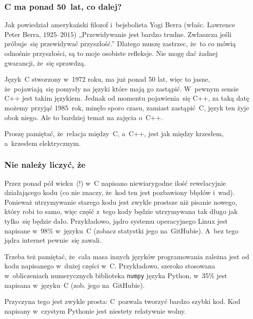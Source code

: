 \documentclass[10pt,t]{beamer}
\begin{document}
\begin{frame}
  \frametitle{C ma ponad 50~lat, co dalej?}


  Jak powiedział amerykański filozof i~bejsbolista Yogi Berra
  (właśc. Lawrence Peter Berra, $1925 \text{--} 2015$) „Przewidywanie jest
  bardzo trudne. Zwłaszcza jeśli próbuje~się przewidywać przyszłość.”
  Dlatego muszę zastrzec, że~to co mówią odnośnie przyszłości, są to moje
  osobiste refleksje. Nie mogę dać żadnej gwarancji, że~się sprawdzą.

  Język~C stworzony w~1972 roku, ma już ponad 50 lat, więc to jasne,
  że~pojawiają~się pomysły na języki które mają go zastąpić. W~pewnym sensie
  C++ jest takim językiem. Jednak od momentu pojawienia~się C++, za taką
  datę możemy przyjąć 1985~rok, minęło sporo czasu, zamiast zastąpić~C,
  język ten żyje obok niego. Ale to bardziej temat na zajęcia o~C++.

  Proszę pamiętać, że~relacja między~C, a~C++, jest jak między krzesłem,
  a~krzesłem elektrycznym.

\end{frame}





\begin{frame}
  \frametitle{Nie należy liczyć, że}


  Przez ponad pół wieku~(!) w~C napisano niewiarygodne ilość rewelacyjnie
  działającego kodu (co nie znaczy, że~kod ten jest pozbawiony błędów
  i~wad). Ponieważ utrzymywanie starego kodu jest zwykle prostsze niż
  pisanie nowego, który robi to samo, więc część z~tego kody będzie
  utrzymywana tak długo jak tylko~się będzie dało. Przykładowo, jądro
  systemu operacyjnego Linux jest napisane w~98\% w~języku~C (zobacz
  statystki jego 
  na~GitHubie). A~bez tego jądra internet pewnie~się zawali.

  Trzeba też pamiętać, że~cała masa innych języków programowania zależna
  jest od kodu napisanego w~dużej części w~C. Przykładowo, szeroko stosowana
  w~obliczeniach numerycznych biblioteka \texttt{numpy} języka Python,
  w~35\% jest napisana w~języku~C (zob. jego
   na~GitHubie).

  Przyczyna tego jest zwykle prosta: C~pozwala tworzyć bardzo szybki kod.
  Kod napisany w~czystym Pythonie jest niestety relatywnie wolny.

\end{frame}
\end{document}
